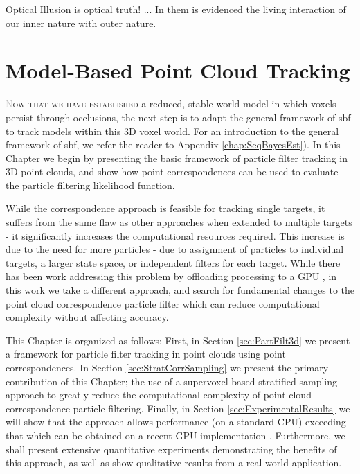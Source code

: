 \begin{savequote}[75mm]
Optical Illusion is optical truth! ... In them is evidenced the living interaction of our inner nature with outer nature.
\end{savequote}

\chapter{Model-Based Point Cloud Tracking}
\label{Chap:ModelBasedTracking}
\lettrine[lines=3, loversize=0.3]{\textcolor{Silver}N}{ow that we have established} a reduced, stable world model in which voxels persist through occlusions, the next step is to adapt the general framework of \gls{sbf} to track models within this 3D voxel world. For an introduction to the general framework of \gls{sbf}, we refer the reader to Appendix \ref{chap:SeqBayesEst}). In this Chapter we begin by presenting the basic framework of particle filter tracking in 3D point clouds, and show how point correspondences can be used to evaluate the particle filtering likelihood function.

While the correspondence approach is feasible for tracking single targets, it suffers from the same flaw as other approaches when extended to multiple targets \cite{MCMCPartFilt_05, ApproxMultiTrack_06,Koo_IROS2013, Breitenstein_ICCV2009} - it significantly increases the computational resources required. This increase is due to the need for more particles - due to assignment of particles to individual targets, a larger state space, or independent filters for each target. While there has been work addressing this problem by offloading processing to a GPU \cite{Choi_IROS2013}, in this work we take a different approach, and search for fundamental changes to the point cloud correspondence particle filter which can reduce computational complexity without affecting accuracy. 

This Chapter is organized as follows: First, in Section \ref{sec:PartFilt3d} we present a framework for particle filter tracking in point clouds using point correspondences. In Section \ref{sec:StratCorrSampling} we present the primary contribution of this Chapter; the use of a supervoxel-based stratified sampling approach to greatly reduce the computational complexity of point cloud correspondence particle filtering. Finally, in Section \ref{sec:ExperimentalResults} we will show that the approach allows performance (on a standard CPU) exceeding that which can be obtained on a recent GPU implementation \cite{Choi_IROS2013}. Furthermore, we shall present extensive quantitative experiments demonstrating the benefits of this approach, as well as show qualitative results from a real-world application. 

